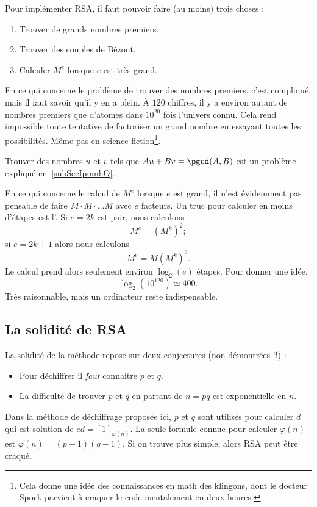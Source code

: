 Pour implémenter RSA, il faut pouvoir faire (au moins) trois choses :
\begin{enumerate}
    \item
        Trouver de grands nombres premiers.
    \item
        Trouver des couples de Bézout.
    \item
        Calculer \( M^e\) lorsque \( e\) est très grand.
\end{enumerate}
En ce qui concerne le problème de trouver des nombres premiers, c'est compliqué, mais il faut savoir qu'il y en a plein. À \( 120\) chiffres, il y a environ autant de nombres premiers que d'atomes dans \( 10^{20}\) fois l'univers connu. Cela rend impossible toute tentative de factoriser un grand nombre en essayant toutes les possibilités. Même pas en science-fiction\footnote{Cela donne une idée des connaissances en math des klingons, dont le docteur Spock parvient à craquer le code mentalement en deux heures.}.

Trouver des nombres \( u\) et \( v\) tels que \( Au+Bv=\pgcd(A,B)\) est un problème expliqué en~\ref{subSecIpmnhO}.

En ce qui concerne le calcul de \( M^e\) lorsque \( e\) est grand, il n'est évidemment pas pensable de faire \( M\cdot M\cdot\ldots M\) avec \( e\) facteurs. Un truc pour calculer en moins d'étapes est l'. Si \( e=2k\) est pair, nous calculons
\begin{equation}
    M^e=(M^k)^2;
\end{equation}
si \( e=2k+1\) alors nous calculons
\begin{equation}
    M^e=M(M^k)^2.
\end{equation}
Le calcul prend alors seulement environ \(  \log_2(e)  \) étapes. Pour donner une idée,
\begin{equation}
    \log_2(10^{120})\simeq 400.
\end{equation}
Très raisonnable, mais un ordinateur reste indispensable.

\subsection{La solidité de RSA}

La solidité de la méthode repose sur deux conjectures (non démontrées !!) :
\begin{itemize}
    \item Pour déchiffrer il \emph{faut} connaitre \( p\) et \( q\).
    \item La difficulté de trouver \( p\) et \( q\) en partant de \( n=pq\) est exponentielle en \( n\).
\end{itemize}
Dans la méthode de déchiffrage proposée ici, \( p\) et \( q\) sont utilisés pour calculer \( d\) qui est solution de \( ed=[1]_{\varphi(n)}\). La seule formule connue pour calculer \( \varphi(n)\) est \( \varphi(n)=(p-1)(q-1)\). Si on trouve plus simple, alors RSA peut être craqué.

